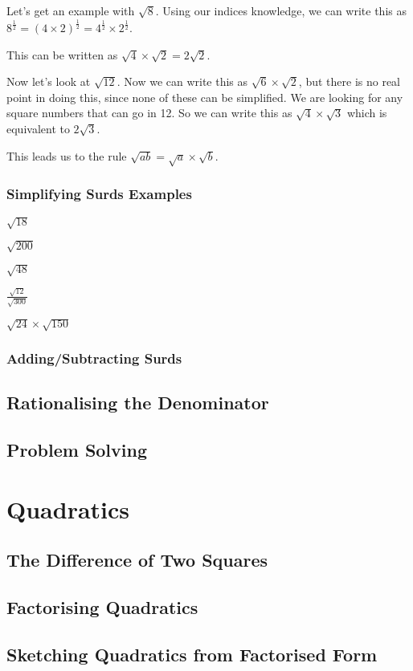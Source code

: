 \documentclass[../maths.tex]{subfiles}
\begin{document}
Let's get an example with $\sqrt{8}$. Using our indices knowledge, we can write this as $8^{\frac{1}{2}}=(4\times 2)^{\frac{1}{2}}=4^{\frac{1}{2}}\times 2^{\frac{1}{2}}$.

This can be written as $\sqrt{4}\times \sqrt{2}=2\sqrt{2}$.

Now let's look at $\sqrt{12}$. Now we can write this as $\sqrt{6}\times \sqrt{2}$, but there is no real point in doing this, since none of these can be simplified.
We are looking for any square numbers that can go in 12. So we can write this as $\sqrt{4}\times \sqrt{3}$ which is equivalent to $2\sqrt{3}$.

This leads us to the rule $\sqrt{ab}=\sqrt{a}\times \sqrt{b}$.
\subsubsection*{Simplifying Surds Examples}
\ex $\sqrt{18}$

\ex $\sqrt{200}$

\ex $\sqrt{48}$

\ex $\frac{\sqrt{12}}{\sqrt{300}}$

\ex $\sqrt{24}\times \sqrt{150}$

\subsubsection*{Adding/Subtracting Surds}



\subsection*{Rationalising the Denominator}
\subsection*{Problem Solving}
\section{Quadratics}
\subsection*{The Difference of Two Squares}
\subsection*{Factorising Quadratics}
\subsection*{Sketching Quadratics from Factorised Form}
\end{document}
